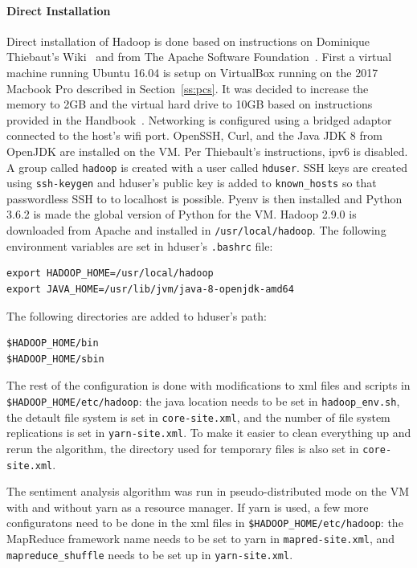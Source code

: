 \paragraph{Direct Installation}
Direct installation of Hadoop is done based on instructions on
Dominique Thiebaut's Wiki~\cite{hid-sp18-419-Thiebaut} and from The
Apache Software
Foundation~\cite{hid-sp18-419-Apache-single-node}. First a virtual
machine running Ubuntu 16.04 is setup on VirtualBox running on the
2017 Macbook Pro described in Section~\ref{ss:pcs}. It was decided to
increase the memory to 2GB and the virtual hard drive to 10GB based on
instructions provided in the Handbook~\cite{las18handbook}. Networking
is configured using a bridged adaptor connected to the host's wifi
port. OpenSSH, Curl, and the Java JDK 8 from OpenJDK are installed on
the VM. Per Thiebault's instructions, ipv6 is disabled. A group
called \verb|hadoop| is created with a user called \verb|hduser|. SSH
keys are created using \verb|ssh-keygen| and hduser's public key is
added to \verb|known_hosts| so that passwordless SSH to to localhost
is possible. Pyenv is then installed and Python 3.6.2 is made the
global version of Python for the VM. Hadoop 2.9.0 is downloaded from
Apache and installed in \verb|/usr/local/hadoop|. The following
environment variables are set in hduser's \verb|.bashrc| file:
\begin{verbatim}
export HADOOP_HOME=/usr/local/hadoop
export JAVA_HOME=/usr/lib/jvm/java-8-openjdk-amd64
\end{verbatim}

The following directories are added to hduser's path:
\begin{verbatim}
$HADOOP_HOME/bin
$HADOOP_HOME/sbin
\end{verbatim}

The rest of the configuration is done with modifications to xml files
and scripts in \verb|$HADOOP_HOME/etc/hadoop|: the java location needs
to be set in \verb|hadoop_env.sh|, the detault file system is set
in \verb|core-site.xml|, and the number of file system replications is
set in \verb|yarn-site.xml|. To make it easier to clean everything up
and rerun the algorithm, the directory used for temporary files is
also set in \verb|core-site.xml|.

The sentiment analysis algorithm was run in pseudo-distributed mode on
the VM with and without yarn as a resource manager. If yarn is used, a
few more configuratons need to be done in the xml files
in \verb|$HADOOP_HOME/etc/hadoop|: the MapReduce framework name needs
to be set to yarn in \verb|mapred-site.xml|,
and \verb|mapreduce_shuffle| needs to be set up
in \verb|yarn-site.xml|.

